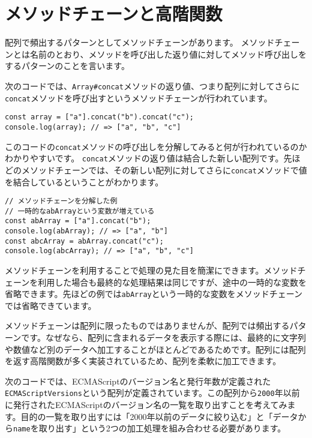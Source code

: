 \hypertarget{method-chain-and-high-order-function}{%
\section{メソッドチェーンと高階関数}\label{method-chain-and-high-order-function}}

配列で頻出するパターンとしてメソッドチェーンがあります。
メソッドチェーンとは名前のとおり、メソッドを呼び出した返り値に対してメソッド呼び出しをするパターンのことを言います。

次のコードでは、\texttt{Array\#concat}メソッドの返り値、つまり配列に対してさらに\texttt{concat}メソッドを呼び出すというメソッドチェーンが行われています。

\begin{lstlisting}
const array = ["a"].concat("b").concat("c");
console.log(array); // => ["a", "b", "c"]
\end{lstlisting}

このコードの\texttt{concat}メソッドの呼び出しを分解してみると何が行われているのかわかりやすいです。
\texttt{concat}メソッドの返り値は結合した新しい配列です。先ほどのメソッドチェーンでは、その新しい配列に対してさらに\texttt{concat}メソッドで値を結合しているということがわかります。

\begin{lstlisting}
// メソッドチェーンを分解した例
// 一時的なabArrayという変数が増えている
const abArray = ["a"].concat("b");
console.log(abArray); // => ["a", "b"]
const abcArray = abArray.concat("c");
console.log(abcArray); // => ["a", "b", "c"]
\end{lstlisting}

メソッドチェーンを利用することで処理の見た目を簡潔にできます。メソッドチェーンを利用した場合も最終的な処理結果は同じですが、途中の一時的な変数を省略できます。先ほどの例では\texttt{abArray}という一時的な変数をメソッドチェーンでは省略できています。

メソッドチェーンは配列に限ったものではありませんが、配列では頻出するパターンです。なぜなら、配列に含まれるデータを表示する際には、最終的に文字列や数値など別のデータへ加工することがほとんどであるためです。配列には配列を返す高階関数が多く実装されているため、配列を柔軟に加工できます。

次のコードでは、ECMAScriptのバージョン名と発行年数が定義された\texttt{ECMAScriptVersions}という配列が定義されています。この配列から\texttt{2000}年以前に発行されたECMAScriptのバージョン名の一覧を取り出すことを考えてみます。目的の一覧を取り出すには「2000年以前のデータに絞り込む」と「データから\texttt{name}を取り出す」という2つの加工処理を組み合わせる必要があります。

